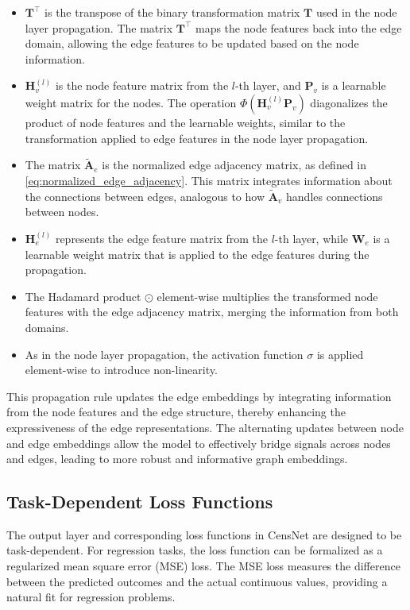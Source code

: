 \begin{itemize}
    \item \textbf{\( \mathbf{T}^\top \)} is the transpose of the binary transformation matrix \( \mathbf{T} \) used in the node layer propagation. The matrix \( \mathbf{T}^\top \) maps the node features back into the edge domain, allowing the edge features to be updated based on the node information.
    \item \( \mathbf{H}^{(l)}_v \) is the node feature matrix from the \( l \)-th layer, and \( \mathbf{P}_v \) is a learnable weight matrix for the nodes. The operation \( \Phi(\mathbf{H}^{(l)}_v \mathbf{P}_v) \) diagonalizes the product of node features and the learnable weights, similar to the transformation applied to edge features in the node layer propagation.
    \item The matrix \( \tilde{\mathbf{A}}_e \) is the normalized edge adjacency matrix, as defined in \cref{eq:normalized_edge_adjacency}. This matrix integrates information about the connections between edges, analogous to how \( \tilde{\mathbf{A}}_v \) handles connections between nodes.
    \item \( \mathbf{H}^{(l)}_e \) represents the edge feature matrix from the \( l \)-th layer, while \( \mathbf{W}_e \) is a learnable weight matrix that is applied to the edge features during the propagation.
    \item The Hadamard product \( \odot \) element-wise multiplies the transformed node features with the edge adjacency matrix, merging the information from both domains.
    \item As in the node layer propagation, the activation function \( \sigma \) is applied element-wise to introduce non-linearity.
\end{itemize}


This propagation rule updates the edge embeddings by integrating information from the node features and the edge structure, thereby enhancing the expressiveness of the edge representations. The alternating updates between node and edge embeddings allow the model to effectively bridge signals across nodes and edges, leading to more robust and informative graph embeddings.




\subsection{Task-Dependent Loss Functions}

The output layer and corresponding loss functions in CensNet are designed to be task-dependent. For regression tasks, the loss function can be formalized as a regularized mean square error (MSE) loss. The MSE loss measures the difference between the predicted outcomes and the actual continuous values, providing a natural fit for regression problems.


